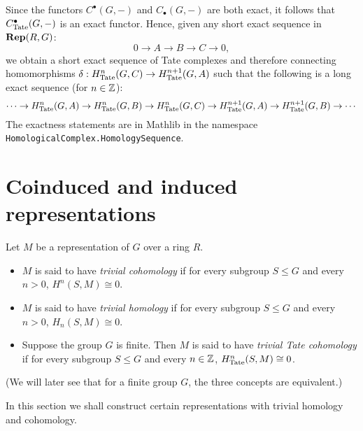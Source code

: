 \begin{definition}	\label{def:Tate long exact sequence}
	\leanok
  Since the functors $C^\bullet(G,-)$ and $C_\bullet(G,-)$ are both exact, it follows
	that $C^\bullet_{\mathrm{Tate}}(G,-)$ is an exact functor.
	Hence, given any short exact sequence in $\mathbf{Rep}(R,G)$:
	\[
		0 \to A \to B \to C \to 0,
	\]
	we obtain a short exact sequence of Tate complexes and therefore
	connecting homomorphisms $\delta : H^n_{\mathrm{Tate}}(G,C) \to H^{n+1}_{\mathrm{Tate}}(G,A)$
	such that the following is a long exact sequence (for $n \in {\mathbb Z}$):
	\[
		\cdots \to H^n_{\mathrm{Tate}}(G,A) \to H^n_{\mathrm{Tate}}(G,B) \to H^n_{\mathrm{Tate}}(G,C)
		\to H^{n+1}_{\mathrm{Tate}}(G,A) \to H^{n+1}_{\mathrm{Tate}}(G,B) \to \cdots
	\]
	The exactness statements are in Mathlib in the namespace
	\texttt{HomologicalComplex.HomologySequence}.
\end{definition}





\section{Coinduced and induced representations}

\begin{definition} \label{def:trivial cohomology}
	\leanok
	Let $M$ be a representation of $G$ over a ring $R$.
	\begin{itemize}
		\item
		$M$ is said to have \emph{trivial cohomology} if for every subgroup $S \le G$
		and every $n > 0$, $H^n(S,M) \cong 0$.
		\item
		$M$ is said to have \emph{trivial homology} if for every subgroup $S \le G$
		and every $n > 0$, $H_n(S,M) \cong 0$.
		\item
		Suppose the group $G$ is finite. Then $M$ is said to have \emph{trivial Tate cohomology} if for every subgroup $S \le G$
		and every $n \in {\mathbb Z}$, $H^n_{\mathrm{Tate}}(S,M) \cong 0$.
	\end{itemize}
	(We will later see that for a finite group $G$, the three concepts are equivalent.)
\end{definition}

In this section we shall construct certain representations with trivial homology and cohomology.

